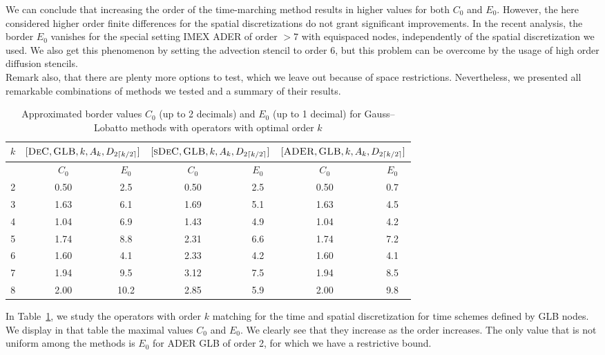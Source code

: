 We can conclude that increasing the order of the time-marching method results in higher values for both $C_0$ and $E_0$. However, the here considered higher order finite differences for the spatial discretizations do not grant significant improvements. In the recent analysis, the border $E_0$ vanishes for the special setting IMEX ADER of order $>7$  with equispaced nodes, independently of the spatial discretization we used. We also get this phenomenon by setting the advection stencil to order 6, but this problem can be overcome by the usage of high order diffusion stencils.\\
Remark also, that there are plenty more options to test, which we leave out because of space restrictions. Nevertheless, we presented all remarkable combinations of methods we tested and a summary of their results.

\begin{table}
	\centering
	\caption{Approximated border values $C_0$ (up to 2 decimals) and $E_0$ (up to 1 decimal) for Gauss--Lobatto methods with operators with optimal order $k$}\label{tab:CE_values}
	\begin{tabular}{|c||c|c||c|c||c|c|}\hline
				$k$&
		\multicolumn{2}{|c||}{$[\textsc{DeC},\textsc{GLB},k,A_k,D_{2\lceil k/2 \rceil}]$}&
		\multicolumn{2}{|c||}{$[\textsc{sDeC},\textsc{GLB},k,A_k,D_{2\lceil k/2 \rceil}]$}&
		\multicolumn{2}{|c|}{$[\textsc{ADER},\textsc{GLB},k,A_k,D_{2\lceil k/2 \rceil}]$}\\\hline
		&$\qquad C_0\qquad$&$E_0$&$\qquad C_0\qquad$&$E_0$&$\qquad C_0\qquad$&$E_0$\\\hline
		2& 0.50 &2.5&0.50&2.5&0.50&0.7\\
		3& 1.63 &6.1&1.69&5.1&1.63&4.5\\
		4& 1.04&6.9&1.43&4.9&1.04&4.2\\
		5& 1.74&8.8&2.31&6.6&1.74&7.2\\
		6& 1.60&4.1&2.33&4.2&1.60&4.1\\
		7& 1.94&9.5&3.12&7.5&1.94&8.5\\
		8&2.00&10.2&2.85&5.9&2.00&9.8\\ \hline
	\end{tabular}
\end{table}

In Table~\ref{tab:CE_values}, we study the operators with order $k$ matching for the time and spatial discretization for time schemes defined by GLB nodes. We display in that table the maximal values $C_0$ and $E_0$. 
We clearly see that they increase as the order increases. 
The only value that is not uniform among the methods is $E_0$ for ADER GLB of order 2, for which we have a restrictive bound.